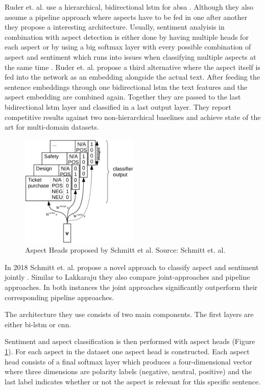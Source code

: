 Ruder et. al. use a hierarchical, bidirectional \gls{lstm} for \gls{absa} \cite{Ruder2016}. Although they also assume a pipeline approach where aspects have to be fed in one after another they propose a interesting architecture. Usually, sentiment analyisis in combination with aspect detection is either done by having multiple heads for each aspect \cite{Schmitt2018} or by using a big softmax layer with every possible combination of aspect and sentiment which runs into issues when classifying multiple aspects at the same time \cite{Lakkaraju2014}. Ruder et. al. propose a third alternative where the aspect itself is fed into the network as an embedding alongside the actual text. After feeding the sentence embeddings through one bidirectional \gls{lstm} the text features and the aspect embedding are combined again. Together they are passed to the last bidirectional \gls{lstm} layer and classified in a last output layer. They report competitive results against two non-hierarchical baselines and achieve state of the art for multi-domain datasets.
\medskip
\begin{figure}[htp]
	\centering
	\includegraphics[width=0.5\textwidth]{figures/02_relatedWork/02_jabsa}
	\caption{Aspect Heads proposed by Schmitt et al. Source: Schmitt et. al. \cite{Schmitt2018}}
	\label{fig:02_j-absa}
\end{figure}

In 2018 Schmitt et. al. propose a novel approach to classify aspect and sentiment jointly \cite{Schmitt2018}. Similar to Lakkaraju they also compare joint-approaches and pipeline approaches. In both instances the joint approaches significantly outperform their corresponding pipeline approaches. 

The architecture they use consists of two main components. The first layers are either bi-\gls{lstm} or \gls{cnn}. 

Sentiment and aspect classification is then performed with aspect heads {(Figure \ref{fig:02_j-absa})}. For each aspect in the dataset one aspect head is constructed. Each aspect head consists of a final softmax layer which produces a four-dimensional vector where three dimensions are polarity labels {(negative, neutral, positive)} and the last label indicates whether or not the aspect is relevant for this specific sentence. 
\medskip

